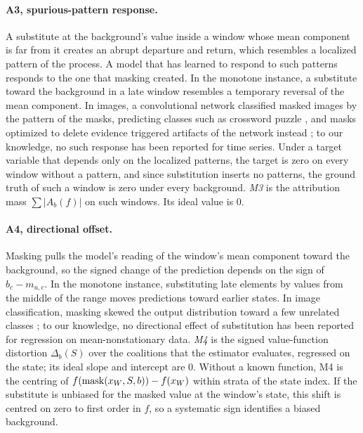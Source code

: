 \documentclass{article}
\begin{document}
\paragraph{A3, spurious-pattern response.} A substitute at the background's value inside a window whose mean component is far from it creates an abrupt departure and return, which resembles a localized pattern of the process. A model that has learned to respond to such patterns responds to the one that masking created. In the monotone instance, a substitute toward the background in a late window resembles a temporary reversal of the mean component. In images, a convolutional network classified masked images by the pattern of the masks, predicting classes such as crossword puzzle \citep{jain2022missingness}, and masks optimized to delete evidence triggered artifacts of the network instead \citep{fong2017interpretable}; to our knowledge, no such response has been reported for time series. Under a target variable that depends only on the localized patterns, the target is zero on every window without a pattern, and since substitution inserts no patterns, the ground truth of such a window is zero under every background. \emph{M3} is the attribution mass $\sum|A_b(f)|$ on such windows. Its ideal value is 0.

\paragraph{A4, directional offset.} Masking pulls the model's reading of the window's mean component toward the background, so the signed change of the prediction depends on the sign of $b_c-m_{u,c}$. In the monotone instance, substituting late elements by values from the middle of the range moves predictions toward earlier states. In image classification, masking skewed the output distribution toward a few unrelated classes \citep{jain2022missingness}; to our knowledge, no directional effect of substitution has been reported for regression on mean-nonstationary data. \emph{M4} is the signed value-function distortion $\Delta_b(S)$ over the coalitions that the estimator evaluates, regressed on the state; its ideal slope and intercept are 0. Without a known function, M4 is the centring of $f(\operatorname{mask}(x_W,S,b))-f(x_W)$ within strata of the state index. If the substitute is unbiased for the masked value at the window's state, this shift is centred on zero to first order in $f$, so a systematic sign identifies a biased background.
\end{document}
